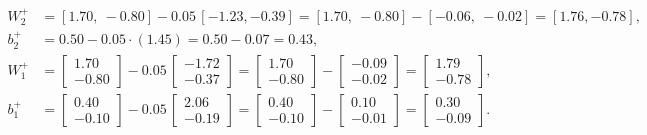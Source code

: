 \documentclass[11pt]{article}
\begin{document}
\begin{align*}
W_2^+&=[1.70,\ -0.80]-0.05\,[-1.23, -0.39]=[1.70,\ -0.80]-[-0.06,\ -0.02]=[1.76, -0.78],\\
b_2^+&=0.50-0.05\cdot(1.45)=0.50-0.07=0.43,\\
W_1^+&=\begin{bmatrix}1.70\\-0.80\end{bmatrix}-0.05\,\begin{bmatrix}-1.72\\-0.37\end{bmatrix}=\begin{bmatrix}1.70\\-0.80\end{bmatrix}-\begin{bmatrix}-0.09\\-0.02\end{bmatrix}=\begin{bmatrix}1.79\\-0.78\end{bmatrix},\\
b_1^+&=\begin{bmatrix}0.40\\-0.10\end{bmatrix}-0.05\,\begin{bmatrix}2.06\\-0.19\end{bmatrix}=\begin{bmatrix}0.40\\-0.10\end{bmatrix}-\begin{bmatrix}0.10\\-0.01\end{bmatrix}=\begin{bmatrix}0.30\\-0.09\end{bmatrix}.
\end{align*}
\end{document}
